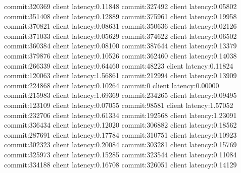 commit:320369 client latency:0.11848
commit:327492 client latency:0.05802
commit:351408 client latency:0.12889
commit:375961 client latency:0.19958
commit:370821 client latency:0.08631
commit:350636 client latency:0.02126
commit:371033 client latency:0.05629
commit:374622 client latency:0.06502
commit:360384 client latency:0.08100
commit:387644 client latency:0.13379
commit:379876 client latency:0.10526
commit:362460 client latency:0.14038
commit:266339 client latency:0.64460
commit:48223 client latency:0.11824
commit:120063 client latency:1.56861
commit:212994 client latency:0.13909
commit:224868 client latency:0.10264
commit:0 client latency:0.00000
commit:215983 client latency:1.69369
commit:234265 client latency:0.09495
commit:123109 client latency:0.07055
commit:98581 client latency:1.57052
commit:232706 client latency:0.61334
commit:192568 client latency:1.23091
commit:336434 client latency:0.12020
commit:306882 client latency:0.18562
commit:287691 client latency:0.17784
commit:310751 client latency:0.10923
commit:302323 client latency:0.20084
commit:303281 client latency:0.15769
commit:325973 client latency:0.15285
commit:323544 client latency:0.11084
commit:334188 client latency:0.16708
commit:326051 client latency:0.14129